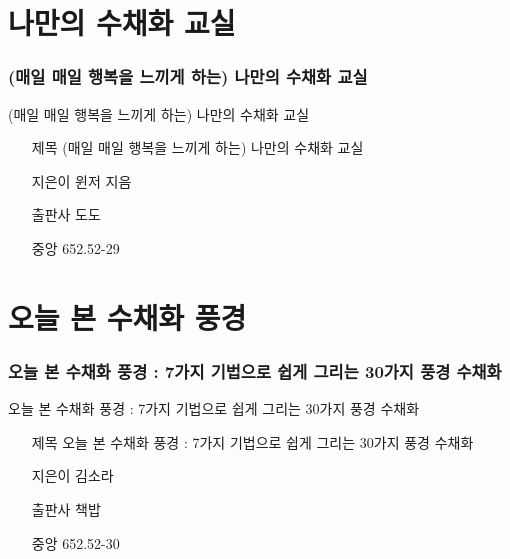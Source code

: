 \documentclass[aspectratio=1610,17pt,xcolor=pdftex,dvipsnames,table,handout]{beamer}
\begin{document}
	

		\section{ 나만의 수채화 교실	}
		\begin{frame} [t,plain]
		\frametitle{(매일 매일 행복을 느끼게 하는) 나만의 수채화 교실	}
			\begin{block} {(매일 매일 행복을 느끼게 하는) 나만의 수채화 교실	}
			\setlength{\leftmargini}{4em}			
			\begin{itemize}
				\item [제목] (매일 매일 행복을 느끼게 하는) 나만의 수채화 교실	
				\item [지은이] 윈저 지음	
				\item [출판사] 도도	
				\item [중앙] 652.52-29 		
			\end{itemize}
			\end{block}						
								
		\end{frame}						

		\section{오늘 본 수채화 풍경 }
		\begin{frame} [t,plain]
		\frametitle{오늘 본 수채화 풍경 : 7가지 기법으로 쉽게 그리는 30가지 풍경 수채화}
			\begin{block} {오늘 본 수채화 풍경 : 7가지 기법으로 쉽게 그리는 30가지 풍경 수채화}
			\setlength{\leftmargini}{4em}			
			\begin{itemize}
				\item [제목] 오늘 본 수채화 풍경 : 7가지 기법으로 쉽게 그리는 30가지 풍경 수채화
				\item [지은이] 김소라	
				\item [출판사] 책밥	
				\item [중앙] 652.52-30		
			\end{itemize}
			\end{block}						
								
		\end{frame}						
\end{document}
